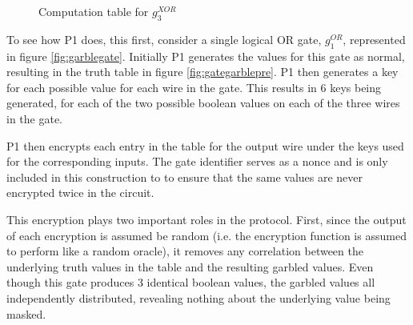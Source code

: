 \begin{figure}[t!]
    \caption{Computation table for $g^{XOR}_3$}
    \label{fig:xorgate}
\end{figure}

To see how \ac{P1} does, this first, consider a single logical OR gate, $g^{OR}_1$, represented in figure \ref{fig:garblegate}. Initially \ac{P1} generates the values for this gate as normal, resulting in the truth table in figure \ref{fig:gategarblepre}. \ac{P1} then generates a key for each possible value for each wire in the gate.  This results in 6 keys being generated, for each of the two possible boolean values on each of the three wires in the gate.

\ac{P1} then encrypts each entry in the table for the output wire under the keys used for the corresponding inputs.  The gate identifier serves as a nonce and is only included in this construction to to ensure that the same values are never encrypted twice in the circuit.

This encryption plays two important roles in the protocol.  First, since the output of each encryption is assumed be random (i.e. the encryption function is assumed to perform like a random oracle), it removes any correlation between the underlying truth values in the table and the resulting garbled values. Even though this gate produces 3 identical boolean values, the garbled values all independently distributed, revealing nothing about the underlying value being masked.

